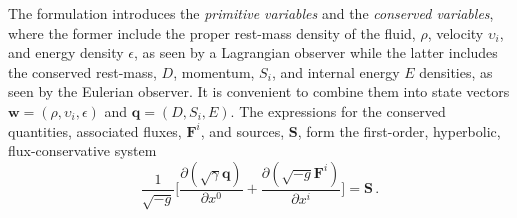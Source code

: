 %
The formulation introduces the \textit{primitive variables} and the \textit{conserved variables},
where the former include the proper rest-mass density of the fluid, $\rho$, 
velocity $\upsilon_i$, and energy density $\epsilon$, as seen by a Lagrangian observer 
while the latter includes 
the conserved rest-mass, $D$, momentum, $S_i$, and internal energy $E$
densities, as seen by the Eulerian observer.
%
It is convenient to combine them into state vectors 
$\boldsymbol{w}=(\rho,\upsilon_i,\epsilon)$ and $\boldsymbol{q}=(D,S_i,E)$.
The expressions for the conserved quantities, associated fluxes, $\boldsymbol{F}^i$,  
and sources, $\boldsymbol{S}$, form the first-order, hyperbolic, flux-conservative system  
\begin{equation}
\frac{1}{\sqrt{-g}}\Big[\frac{\partial(\sqrt{\gamma}\boldsymbol{q})}{\partial x^0} + \frac{\partial(\sqrt{-g}\boldsymbol{F}^{i})}{\partial x^i}\Big] = \boldsymbol{S}\, .
\label{eq:theory:valencia} %
\end{equation}
